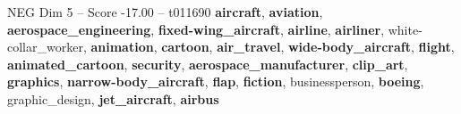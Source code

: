 \begin{textsample}{NEG Dim 5 – Score -17.00 – t011690}  \label{ex:f5_neg_019}
\textbf{aircraft}, \textbf{aviation}, \textbf{aerospace\_engineering}, \textbf{fixed-wing\_aircraft}, \textbf{airline}, \textbf{airliner}, white-collar\_worker, \textbf{animation}, \textbf{cartoon}, \textbf{air\_travel}, \textbf{wide-body\_aircraft}, \textbf{flight}, \textbf{animated\_cartoon}, \textbf{security}, \textbf{aerospace\_manufacturer}, \textbf{clip\_art}, \textbf{graphics}, \textbf{narrow-body\_aircraft}, \textbf{flap}, \textbf{fiction}, businessperson, \textbf{boeing}, graphic\_design, \textbf{jet\_aircraft}, \textbf{airbus}

\end{textsample}

